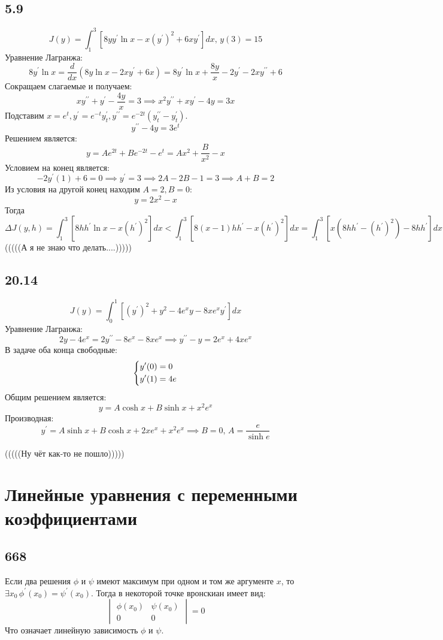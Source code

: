 \documentclass[12pt]{article}
\begin{document}
\subsection*{5.9}
\[
    J(y) = \int_{1}^{3} [8y y^{\prime} \ln x - x(y^{\prime} )^2 + 6xy^{\prime}]dx, \, y(3) = 15
\]
Уравнение Лагранжа: 
\[
    8y^{\prime} \ln x = \frac{d}{dx} (8y\ln x - 2xy^{\prime} + 6x) = 
    8y^{\prime} \ln x + \frac{8y}{x} - 2y^{\prime} - 2xy^{\prime\prime} + 6
\]
Сокращаем слагаемые и получаем: 
\[
    xy^{\prime\prime} + y^{\prime} - \frac{4y}{x} = 3 \implies 
    x^2 y^{\prime\prime} + xy^{\prime} - 4y = 3x  
\]
Подставим $x = e^t, y^{\prime} = e^{-t} y^{\prime}_t, y^{\prime\prime} = e^{-2t} (y^{\prime\prime}_t - y^{\prime}_t)$.
\[
    y^{\prime\prime} - 4y = 3e^t
\]
Решением является: 
\[
    y = Ae^{2t} + Be^{-2t} - e^t = A x^2 + \frac{B}{x^2} - x
\]
Условием на конец является: 
\[
    - 2 y^{\prime}(1) + 6 = 0 \implies y^{\prime} = 3 \implies 
    2A - 2B - 1 = 3 \implies A + B = 2
\]
Из условия на другой конец находим $A = 2, B = 0$:
\[
    y = 2x^2 - x
\] 
Тогда 
\[
    \Delta J(y, h) = \int_{1}^{3} [8 h h^{\prime} \ln x - x (h^{\prime})^2] dx < 
    \int_{1}^{3} [8 (x - 1) h h^{\prime} - x (h^{\prime})^2] dx = 
    \int_{1}^{3} [x (8h h^{\prime} - (h^{\prime})^2) - 8h h^{\prime}]dx
\]
(((((А я не знаю что делать....)))))
\subsection*{20.14}
\[
    J(y) = \int_{0}^{1} [(y^{\prime})^2 + y^2 - 4e^x y - 8x e^x y^{\prime}] dx 
\]
Уравнение Лагранжа: 
\[
    2y - 4e^x = 2y^{\prime\prime} - 8 e^x - 8x e^x \implies 
    y^{\prime\prime} - y = 2e^x + 4x e^x
\]
В задаче оба конца свободные: 
\[
    \begin{dcases}
        y^{\prime}(0) = 0 \\
        y^{\prime}(1) = 4e
    \end{dcases}
\] 
Общим решением является: 
\[
    y = A \cosh x + B \sinh x + x^2 e^x
\]
Производная: 
\[
    y^{\prime} = A \sinh x + B \cosh x + 2x e^x + x^2 e^x \implies B = 0, \, A = \frac{e}{\sinh e}
\]

(((((Ну чёт как-то не пошло)))))

\section{Линейные уравнения с переменными коэффициентами}
\subsection*{668}
Если два решения $\phi$ и $\psi$ имеют максимум при одном и том же аргументе $x$, то $\exists x_0 \, \phi^{\prime}(x_0) = \psi^{\prime}(x_0)$. 
Тогда в некоторой точке вронскиан имеет вид: 
\[
    \begin{vmatrix}
        \phi(x_0) & \psi(x_0) \\
        0 & 0
    \end{vmatrix} = 
    0
\]  
Что означает линейную зависимость $\phi$ и $\psi$. 
\end{document}
